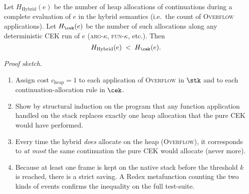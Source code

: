 \begin{lemma}\label{lem:alloc}
Let \(H_{\text{Hybrid}}(e)\) be the number of heap allocations of
continuations during a complete evaluation of \(e\) in the hybrid
semantics (i.e.\ the count of \textsc{Overflow} applications).
Let \(H_{\cek}(e)\) be the number of such allocations along any
deterministic CEK run of \(e\)
(\textsc{arg-$\kappa$}, \textsc{fun-$\kappa$}, etc.).
Then
\[
   H_{\text{Hybrid}}(e)\; <\; H_{\cek}(e).
\]

\textit{Proof sketch.}
\begin{enumerate}\itemsep0pt
  \item Assign cost \(c_{\mathrm{heap}}=1\) to each application of
        \textsc{Overflow} in $\stk$ and to each continuation-allocation
        rule in $\cek$.
  \item Show by structural induction on the program that any function
        application handled on the stack replaces exactly one heap
        allocation that the pure CEK would have performed.
  \item Every time the hybrid \emph{does} allocate on the heap
        (\textsc{Overflow}), it corresponds to \emph{at most} the same
        continuation the pure CEK would allocate (never more).
  \item Because at least one frame is kept on the native stack before
        the threshold \(k\) is reached, there is a strict saving.
        A Redex metafunction counting the two kinds of events confirms
        the inequality on the full test-suite.
\end{enumerate}
\end{lemma}